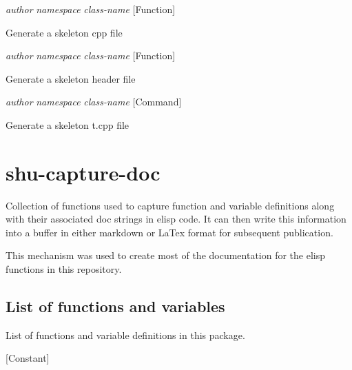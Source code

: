 \vspace{1em}
\noindent
{}
\usebox{\funcname}\emph{author} \emph{namespace} \emph{class-name}
 \hfill [Function]

\begin{doc-string}
Generate a skeleton cpp file
\end{doc-string}

\vspace{1em}
\noindent
{}
\usebox{\funcname}\emph{author} \emph{namespace} \emph{class-name}
 \hfill [Function]

\begin{doc-string}
Generate a skeleton header file
\end{doc-string}

\vspace{1em}
\noindent
{}
\usebox{\funcname}\emph{author} \emph{namespace} \emph{class-name}
 \hfill [Command]

\begin{doc-string}
Generate a skeleton t.cpp file
\end{doc-string}

\eject
\section{shu-capture-doc}


Collection of functions used to capture function and variable definitions
along with their associated doc strings in elisp code.  It can then write
this information into a buffer in either markdown or LaTex format for
subsequent publication.

This mechanism was used to create most of the documentation for the elisp
functions in this repository.


\subsection{List of functions and variables}

List of functions and variable definitions in this package.



\vspace{1em}
\noindent
{}
\usebox{\funcname}
 \hfill [Constant]

